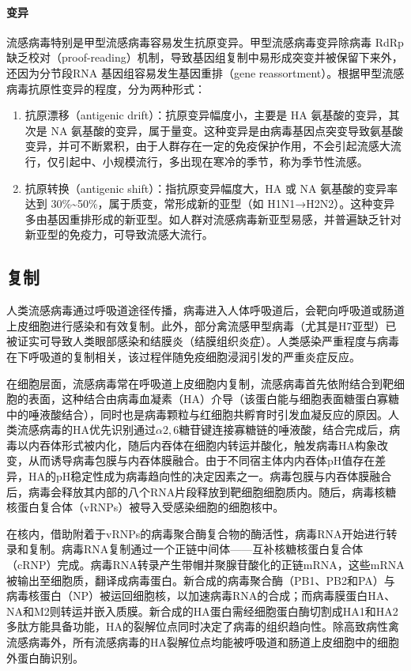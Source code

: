\documentclass[9pt,a4paper,twoside]{rho-class/rho}
\begin{document}
\paragraph{变异}流感病毒特别是甲型流感病毒容易发生抗原变异。甲型流感病毒变异除病毒 RdRp 缺乏校对（proof-reading）机制，导致基因组复制中易形成突变并被保留下来外，还因为分节段RNA 基因组容易发生基因重排（gene reassortment）。根据甲型流感病毒抗原性变异的程度，分为两种形式：
\begin{enumerate}
    \item 抗原漂移（antigenic drift）：抗原变异幅度小，主要是 HA 氨基酸的变异，其次是 NA 氨基酸的变异，属于量变。这种变异是由病毒基因点突变导致氨基酸变异，并可不断累积，由于人群存在一定的免疫保护作用，不会引起流感大流行，仅引起中、小规模流行，多出现在寒冷的季节，称为季节性流感。
    \item 抗原转换（antigenic shift）：指抗原变异幅度大，HA 或 NA 氨基酸的变异率达到 30\%\textasciitilde50\%，属于质变，常形成新的亚型（如 H1N1→H2N2）。这种变异多由基因重排形成的新亚型。如人群对流感病毒新亚型易感，并普遍缺乏针对新亚型的免疫力，可导致流感大流行。
\end{enumerate}

\subsection{复制}


    人类流感病毒通过呼吸道途径传播，病毒进入人体呼吸道后，会靶向呼吸道或肠道上皮细胞进行感染和有效复制。此外，部分禽流感甲型病毒（尤其是H7亚型）已被证实可导致人类眼部感染和结膜炎（结膜组织炎症）。人类感染严重程度与病毒在下呼吸道的复制相关，该过程伴随免疫细胞浸润引发的严重炎症反应。

    在细胞层面，流感病毒常在呼吸道上皮细胞内复制，流感病毒首先依附结合到靶细胞的表面，这种结合由病毒血凝素（HA）介导（该蛋白能与细胞表面糖蛋白寡糖中的唾液酸结合），同时也是病毒颗粒与红细胞共孵育时引发血凝反应的原因。人类流感病毒的HA优先识别通过$\alpha2,6$糖苷键连接寡糖链的唾液酸，结合完成后，病毒以内吞体形式被内化，随后内吞体在细胞内转运并酸化，触发病毒HA构象改变，从而诱导病毒包膜与内吞体膜融合。由于不同宿主体内内吞体pH值存在差异，HA的pH稳定性成为病毒趋向性的决定因素之一。病毒包膜与内吞体膜融合后，病毒会释放其内部的八个RNA片段释放到靶细胞细胞质内。随后，病毒核糖核蛋白复合体（vRNPs）被导入受感染细胞的细胞核中。
    
    在核内，借助附着于vRNPs的病毒聚合酶复合物的酶活性，病毒RNA开始进行转录和复制。病毒RNA复制通过一个正链中间体——互补核糖核蛋白复合体（cRNP）完成。病毒RNA转录产生带帽并聚腺苷酸化的正链mRNA，这些mRNA被输出至细胞质，翻译成病毒蛋白。新合成的病毒聚合酶（PB1、PB2和PA）与病毒核蛋白（NP）被运回细胞核，以加速病毒RNA的合成；而病毒膜蛋白HA、NA和M2则转运并嵌入质膜。新合成的HA蛋白需经细胞蛋白酶切割成HA1和HA2多肽方能具备功能，HA的裂解位点同时决定了病毒的组织趋向性。除高致病性禽流感病毒外，所有流感病毒的HA裂解位点均能被呼吸道和肠道上皮细胞中的细胞外蛋白酶识别。
    
\end{document}

